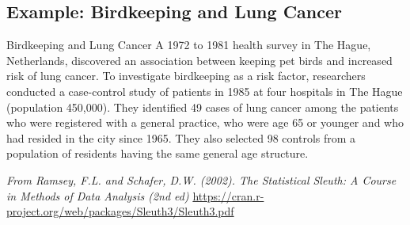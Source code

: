 \documentclass[oneside]{book}\usepackage[]{graphicx}\usepackage[svgnames]{xcolor}
\begin{document}
\subsection*{Example: Birdkeeping and Lung Cancer}
\begin{Example}{Birdkeeping and Lung Cancer}
      A 1972 to 1981 health survey in The Hague, Netherlands, discovered an association
      between keeping pet birds and increased risk of lung cancer. To investigate birdkeeping
      as a risk factor, researchers conducted a case-control study of patients in 1985 at four
      hospitals in The Hague (population 450,000). They identified 49 cases of lung cancer
      among the patients who were registered with a general practice, who were age 65 or
      younger and who had resided in the city since 1965. They also selected 98 controls
      from a population of residents having the same general age structure.

      \emph{From Ramsey, F.L. and Schafer, D.W. (2002). The Statistical Sleuth: A Course in Methods of Data Analysis
            (2nd ed)}
      \href{https://cran.r-project.org/web/packages/Sleuth3/Sleuth3.pdf}{https://cran.r-project.org/web/packages/Sleuth3/Sleuth3.pdf}
\end{Example}
\end{document}
